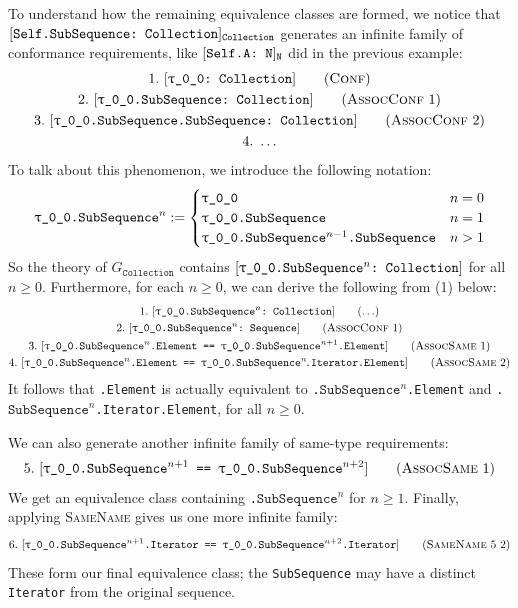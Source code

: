 \documentclass[../generics]{subfiles}
\begin{document}
\begin{example}
To understand how the remaining equivalence classes are formed, we notice that $[\texttt{Self.SubSequence:~Collection}]_{\texttt{Collection}}$ generates an infinite family of conformance requirements, like $[\texttt{Self.A:~N}]_{\texttt{N}}$ did in the previous example:
\begin{gather*}
\ConfStep{\rT}{Collection}{1}\\
\AssocConfStep{1}{\rT.SubSequence}{Collection}{2}\\
\AssocConfStep{2}{\rT.SubSequence.SubSequence}{Collection}{3}\\
4.\ \ldots
\end{gather*}
To talk about this phenomenon, we introduce the following notation:
\begin{gather*}
\texttt{\rT.$\texttt{SubSequence}^n$} := \begin{cases}
\rT&n=0\\
\texttt{\rT.SubSequence}&n=1\\
\texttt{\rT.SubSequence}^{n-1}\texttt{.SubSequence}&n>1
\end{cases}
\end{gather*}
So the theory of $G_\texttt{Collection}$ contains $\ConfReq{\rT.$\texttt{SubSequence}^n$}{Collection}$ for all $n\geq 0$. Furthermore, for each $n\geq 0$, we can derive the following from (1) below:
\begin{gather*}
\AnyStep{\ConfReq{\rT.$\texttt{SubSequence}^n$}{Collection}}{1}\\
\AssocConfStep{1}{\rT.$\texttt{SubSequence}^n$}{Sequence}{2}\\
\AssocSameStep{1}{\rT.$\texttt{SubSequence}^n$.Element}{\rT.$\texttt{SubSequence}^{n+1}$.Element}{3}\\
\AssocSameStep{2}{\rT.$\texttt{SubSequence}^n$.Element}{\rT.$\texttt{SubSequence}^n\!$.Iterator.Element}{4}
\end{gather*}
It follows that \texttt{\rT.Element} is actually equivalent to \texttt{\rT.$\texttt{SubSequence}^n$.Element} and \texttt{\rT.$\texttt{SubSequence}^n$.Iterator.Element}, for all $n \geq 0$.

We can also generate another infinite family of same-type requirements:
\begin{gather*}
\AssocSameStep{1}{\rT.$\texttt{SubSequence}^{n+1}$}{\rT.$\texttt{SubSequence}^{n+2}$}{5}
\end{gather*}
We get an equivalence class containing \texttt{\rT.$\texttt{SubSequence}^n$} for $n\geq 1$. Finally, applying \textsc{SameName} gives us one more infinite family:
\begin{gather*}
\SameNameStep{5}{2}{\rT.$\texttt{SubSequence}^{n+1}$.Iterator}{\rT.$\texttt{SubSequence}^{n+2}$.Iterator}{6}
\end{gather*}
These form our final equivalence class; the \texttt{SubSequence} may have a distinct \texttt{Iterator} from the original sequence.


\end{example}
\end{document}
